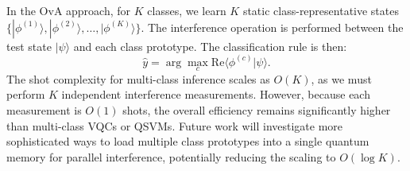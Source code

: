 \documentclass[conference]{IEEEtran}
\begin{document}
In the OvA approach, for $K$ classes, we learn $K$ static class-representative states $\{|\phi^{(1)}\rangle, |\phi^{(2)}\rangle, \dots, |\phi^{(K)}\rangle\}$. The interference operation is performed between the test state $|\psi\rangle$ and each class prototype. The classification rule is then:
\begin{equation}
    \hat{y} = \arg\max_c \mathrm{Re}\langle \phi^{(c)} | \psi \rangle.
\end{equation}
The shot complexity for multi-class inference scales as $O(K)$, as we must perform $K$ independent interference measurements. However, because each measurement is $O(1)$ shots, the overall efficiency remains significantly higher than multi-class VQCs or QSVMs. Future work will investigate more sophisticated ways to load multiple class prototypes into a single quantum memory for parallel interference, potentially reducing the scaling to $O(\log K)$.
\end{document}
